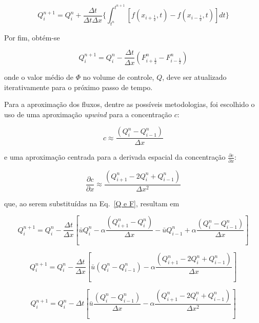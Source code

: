 \[
    Q_i^{n+1} = Q_i^n + \frac{\Delta t}{\Delta t \Delta x} \Bigg\{
    \int_{t^n}^{t^{n+1}} [f(x_{i+\frac{1}{2}},t) - f(x_{i-\frac{1}{2}},t)]dt
    \Bigg\}
\]

\noindent Por fim, obtém-se

\begin{equation}\label{Q e F}
    Q_i^{n+1} = Q_i^n - \frac{\Delta t}{\Delta x}(F_{i+\frac{1}{2}}^n -
    F_{i-\frac{1}{2}}^n)
\end{equation}

\noindent onde o valor médio de $\Phi$ no volume de controle, $Q$, deve
ser atualizado iterativamente para o próximo passo de tempo.

Para a aproximação dos fluxos, dentre as possíveis metodologias, foi escolhido o
uso de uma aproximação \emph{upwind} para a concentração $c$:

\begin{equation}
    c \approx \frac{(Q_i^n - Q_{i-1}^n)}{\Delta x}
\end{equation}

\noindent e uma aproximação
centrada para a derivada espacial da concentração $\frac{\partial c}{\partial
x}$:

\begin{equation}
    \frac{\partial c}{\partial x} \approx \frac{(Q_{i+1}^n - 2Q_i^n +
    Q_{i-1}^n)}{\Delta x^2}
\end{equation}

\noindent que, ao serem substituídas na Eq.\ \ref{Q e F}, resultam em

\[
     Q_i^{n+1} = Q_i^n - \frac{\Delta t}{\Delta x} \left[
     \bar{u}Q_i^n - \alpha\frac{(Q_{i+1}^n - Q_i^n)}{\Delta x}
     - \bar{u}Q_{i-1}^n + \alpha\frac{(Q_i^n - Q_{i-1}^n)}{\Delta x}
     \right]
\]

\[
    Q_i^{n+1} = Q_i^n - \frac{\Delta t}{\Delta x} \left[
    \bar{u}(Q_i^n - Q_{i-1}^n) - \alpha\frac{(Q_{i+1}^n - 2Q_i^n +
    Q_{i-1}^n)}{\Delta x}
    \right]
\]

\begin{equation}\label{eq. final}
    Q_i^{n+1} = Q_i^n - \Delta t \left[
    \bar{u}\frac{(Q_i^n - Q_{i-1}^n)}{\Delta x} - \alpha\frac{(Q_{i+1}^n -
    2Q_i^n + Q_{i-1}^n)}{\Delta x^2}
    \right]
\end{equation}